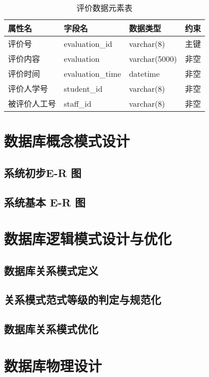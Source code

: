 \documentclass{article}
\begin{document}
\begin{table}[H]
    \centering
    \begin{tabularx}{\textwidth}{|>{\raggedright\arraybackslash}X|>{\raggedright\arraybackslash}X|>{\raggedright\arraybackslash}X|>{\raggedright\arraybackslash}X|}
    \toprule
    \textbf{属性名} & \textbf{字段名} & \textbf{数据类型} & \textbf{约束} \\ \midrule
    评价号 & evaluation\_id & varchar(8) & 主键 \\ \midrule
    评价内容 & evaluation & varchar(5000) & 非空 \\ \midrule
    评价时间 & evaluation\_time & datetime & 非空 \\ \midrule
    评价人学号 & student\_id & varchar(8) & 非空 \\ \midrule
    被评价人工号 & staff\_id & varchar(8) & 非空 \\ \bottomrule
    \end{tabularx}
    \caption{评价数据元素表}
    \label{tab:evaluation_elements}
\end{table}

\section{数据库概念模式设计}
\subsection{系统初步E-R 图}

\subsection{系统基本 E-R 图}

\section{数据库逻辑模式设计与优化}
\subsection{数据库关系模式定义}

\subsection{关系模式范式等级的判定与规范化}

\subsection{数据库关系模式优化}

\section{数据库物理设计}
\end{document}
